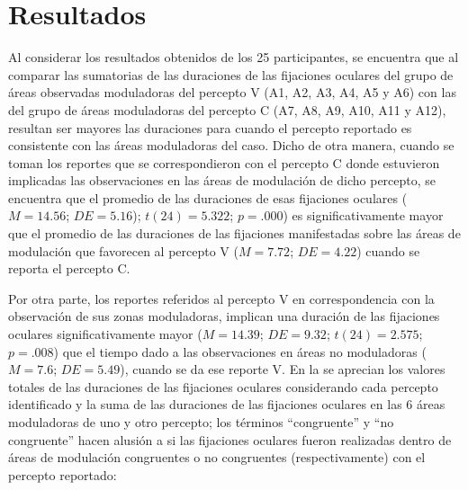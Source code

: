 \documentclass[spanish]{textolivre}
\begin{document}
\section{Resultados}\label{sec-modelo}
Al considerar los resultados obtenidos de los 25 participantes, se encuentra que al comparar las sumatorias de las duraciones de las fijaciones oculares del grupo de áreas observadas moduladoras del percepto V (A1, A2, A3, A4, A5 y A6) con las del grupo de áreas moduladoras del percepto C (A7, A8, A9, A10, A11 y A12), resultan ser mayores las duraciones para cuando el percepto reportado es consistente con las áreas moduladoras del caso. Dicho de otra manera, cuando se toman los reportes que se correspondieron con el percepto C donde estuvieron implicadas las observaciones en las áreas de modulación de dicho percepto, se encuentra que el promedio de las duraciones de esas fijaciones oculares ($M = 14.56$; $DE = 5.16$); $t(24) = 5.322$; $p = .000$) es significativamente mayor que el promedio de las duraciones de las fijaciones manifestadas sobre las áreas de modulación que favorecen al percepto V ($M = 7.72$; $DE = 4.22$) cuando se reporta el percepto C.

Por otra parte, los reportes referidos al percepto V en correspondencia con la observación de sus zonas moduladoras, implican una duración de las fijaciones oculares significativamente mayor ($M = 14.39$; $DE = 9.32$; $t(24) = 2.575$; $p = .008$) que el tiempo dado a las observaciones en áreas no moduladoras ($M = 7.6$; $DE = 5.49$), cuando se da ese reporte V. En la  se aprecian los valores totales de las duraciones de las fijaciones oculares considerando cada percepto identificado y la suma de las duraciones de las fijaciones oculares en las 6 áreas moduladoras de uno y otro percepto; los términos “congruente” y “no congruente” hacen alusión a si las fijaciones oculares fueron realizadas dentro de áreas de modulación congruentes o no congruentes (respectivamente) con el percepto reportado:
\end{document}

